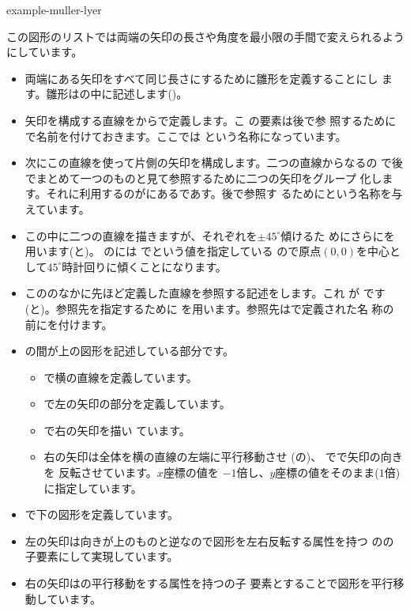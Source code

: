 {example-muller-lyer}

この図形のリストでは両端の矢印の長さや角度を最小限の手間で変えられるよう
にしています。
{}
\begin{itemize}
 \item 両端にある矢印をすべて同じ長さにするために雛形を定義することにし
       ます。雛形はの中に記述します()。
 \item 矢印を構成する直線をからで定義します。こ
       の要素は後で参
       照するためにで名前を付けておきます。ここでは
       という名称になっています。
 \item 次にこの直線を使って片側の矢印を構成します。二つの直線からなるの
       で後でまとめて一つのものと見て参照するために二つの矢印をグループ
       化します。それに利用するのがにあるであす。後で参照す
       るためにという名称を与えています。
 \item この中に二つの直線を描きますが、それぞれを$\pm45^{\circ}$傾けるた
       めにさらにを用います(と)。
       のには 
       でという値を指定している
       ので原点$(0,0)$を中心として$45^{\circ}$時計回りに傾くことになります。
 \item こののなかに先ほど定義した直線を参照する記述をします。これ
       が  です(と)。参照先を指定するために
       を用います。参照先はで定義された名
       称の前に\AttribVal{\#}{}を付けます。
 \item {}の間が上の図形を記述している部分です。
\begin{itemize}
 \item {}で横の直線を定義しています。
 \item {}で左の矢印の部分を定義しています。
 \item {}で右の矢印を描い
       ています。
 \item 右の矢印は全体を横の直線の左端に平行移動させ
       (の)、
 でで矢印の向きを
       反転させています。$x$座標の値を
       $-1$倍し、$y$座標の値をそのまま($1$倍)に指定しています。
\end{itemize}
 \item {}で下の図形を定義しています。
 \item 左の矢印は向きが上のものと逆なので図形を左右反転する属性を持つ
       のの子要素にして実現しています。
 \item 右の矢印はの平行移動をする属性を持つの子
       要素とすることで図形を平行移動しています。
\end{itemize}
